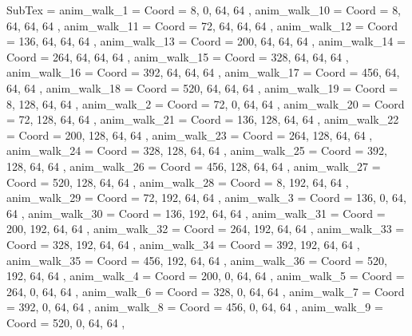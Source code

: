 SubTex = {
	anim_walk_1								= { Coord = { 8, 0, 64, 64 } },
	anim_walk_10								= { Coord = { 8, 64, 64, 64 } },
	anim_walk_11								= { Coord = { 72, 64, 64, 64 } },
	anim_walk_12								= { Coord = { 136, 64, 64, 64 } },
	anim_walk_13								= { Coord = { 200, 64, 64, 64 } },
	anim_walk_14								= { Coord = { 264, 64, 64, 64 } },
	anim_walk_15								= { Coord = { 328, 64, 64, 64 } },
	anim_walk_16								= { Coord = { 392, 64, 64, 64 } },
	anim_walk_17								= { Coord = { 456, 64, 64, 64 } },
	anim_walk_18								= { Coord = { 520, 64, 64, 64 } },
	anim_walk_19								= { Coord = { 8, 128, 64, 64 } },
	anim_walk_2								= { Coord = { 72, 0, 64, 64 } },
	anim_walk_20								= { Coord = { 72, 128, 64, 64 } },
	anim_walk_21								= { Coord = { 136, 128, 64, 64 } },
	anim_walk_22								= { Coord = { 200, 128, 64, 64 } },
	anim_walk_23								= { Coord = { 264, 128, 64, 64 } },
	anim_walk_24								= { Coord = { 328, 128, 64, 64 } },
	anim_walk_25								= { Coord = { 392, 128, 64, 64 } },
	anim_walk_26								= { Coord = { 456, 128, 64, 64 } },
	anim_walk_27								= { Coord = { 520, 128, 64, 64 } },
	anim_walk_28								= { Coord = { 8, 192, 64, 64 } },
	anim_walk_29								= { Coord = { 72, 192, 64, 64 } },
	anim_walk_3								= { Coord = { 136, 0, 64, 64 } },
	anim_walk_30								= { Coord = { 136, 192, 64, 64 } },
	anim_walk_31								= { Coord = { 200, 192, 64, 64 } },
	anim_walk_32								= { Coord = { 264, 192, 64, 64 } },
	anim_walk_33								= { Coord = { 328, 192, 64, 64 } },
	anim_walk_34								= { Coord = { 392, 192, 64, 64 } },
	anim_walk_35								= { Coord = { 456, 192, 64, 64 } },
	anim_walk_36								= { Coord = { 520, 192, 64, 64 } },
	anim_walk_4								= { Coord = { 200, 0, 64, 64 } },
	anim_walk_5								= { Coord = { 264, 0, 64, 64 } },
	anim_walk_6								= { Coord = { 328, 0, 64, 64 } },
	anim_walk_7								= { Coord = { 392, 0, 64, 64 } },
	anim_walk_8								= { Coord = { 456, 0, 64, 64 } },
	anim_walk_9								= { Coord = { 520, 0, 64, 64 } },
}
